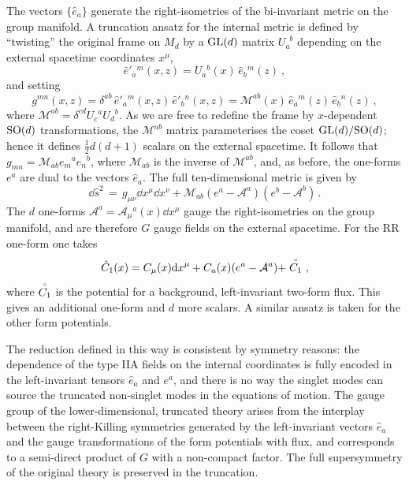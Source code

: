 \documentclass[debug]{phd}
\begin{document}
				The vectors $\{\hat{e}_a\}$ generate the right-isometries of the bi-invariant metric on the group manifold. 
				A truncation ansatz for the internal metric is defined by ``twisting'' the original frame on $M_d$ by a $\mathrm{GL}(d)$ matrix $U_a^{\phantom{a}b}$ depending on the external spacetime coordinates $x^\mu$,
						\begin{equation}
							\hat{e}'_a{}^m(x,z) = U_a{}^b(x)\, \hat{e}_b{}^m(z)\ ,
						\end{equation}
				and setting
						\begin{equation}
							g^{mn}(x,z) = \delta^{ab}\, \hat{e}'_a{}^m(x,z) \,\hat{e}'_b{}^n(x,z) = \mathcal{M}^{ab}(x) \,\hat{e}_a{}^m(z) \,\hat{e}_b{}^n(z)\ ,
						\end{equation}
				where $\mathcal{M}^{ab} = \delta^{cd} U_c{}^a U_d{}^b$. 
				As we are free to redefine the frame by $x$-dependent $\mathrm{SO}(d)$ transformations, the $\mathcal{M}^{ab}$ matrix parameterises the coset $\mathrm{GL}(d)/\mathrm{SO}(d)$; hence it defines $\frac{1}{2}d(d+1)$ scalars on the external spacetime. 
				It follows that $g_{mn} =\mathcal{M}_{ab} e_m{}^a e_n{}^b$, where $\mathcal{M}_{ab}$ is the inverse of $\mathcal{M}^{ab}$, and, as before, the one-forms $e^a$ are dual to the vectors $\hat{e}_a$. 
				The full ten-dimensional metric is given by
						\begin{equation}
							\dd \hat{s}^2\, = \, g_{\mu\nu}\dd{x}^\mu\dd{x}^\nu + \mathcal{M}_{ab} (e^a - \mathcal{A}^a)(e^b - \mathcal{A}^b)\,.
						\end{equation}
				The $d$ one-forms $\mathcal{A}^a=\mathcal{A}_\mu{}^a(x)\dd{x}^\mu$ gauge the right-isometries on the group manifold, and are therefore $G$ gauge fields on the external spacetime.
				For the RR one-form one takes
						\begin{equation}
							\hat{C}_1(x) = C_\mu(x) \mathrm{d}{x}^\mu + C_a(x) (e^a - \mathcal{A}^a) + \stackrel{\scriptscriptstyle{\circ}}{C_1}\ ,
						\end{equation}
				where $\stackrel{\scriptscriptstyle{\circ}}{C_1}$ is the potential for a background, left-invariant two-form flux. 
				This gives an additional one-form and $d$ more scalars. 
				A similar ansatz is taken for the other form potentials.
 
				The reduction defined in this way is consistent by symmetry reasons: the dependence of the type IIA fields on the internal coordinates is fully encoded in the left-invariant tensors $\hat{e}_a$ and $e^a$, and there is no way the singlet modes can source the truncated non-singlet modes in the equations of motion.
				The gauge group of the lower-dimensional, truncated theory arises from the interplay between the right-Killing symmetries generated by the left-invariant vectors $\hat{e}_a$ and the gauge transformations of the form potentials with flux, and corresponds to a semi-direct product of $G$ with a non-compact factor. 
				The full supersymmetry of the original theory is preserved in the truncation.
				
\end{document}
